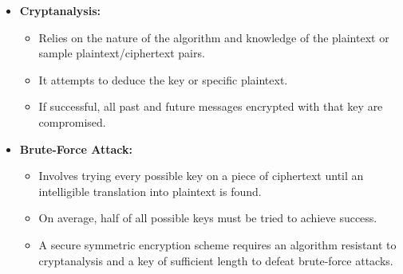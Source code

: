 \begin{itemize}
    \item \textbf{Cryptanalysis:} 
    \begin{itemize}
        \item Relies on the nature of the algorithm and knowledge of the plaintext or sample plaintext/ciphertext pairs.
        \item  It attempts to deduce the key or specific plaintext.
        \item If successful, all past and future messages encrypted with that key are compromised.
    \end{itemize}
     
    \item \textbf{Brute-Force Attack:}
    \begin{itemize}
        \item  Involves trying every possible key on a piece of ciphertext until an intelligible translation into plaintext is found.
        \item  On average, half of all possible keys must be tried to achieve success.
        \item A secure symmetric encryption scheme requires an algorithm resistant to cryptanalysis and a key of sufficient length to defeat brute-force attacks.
   
    \end{itemize}
\end{itemize}



